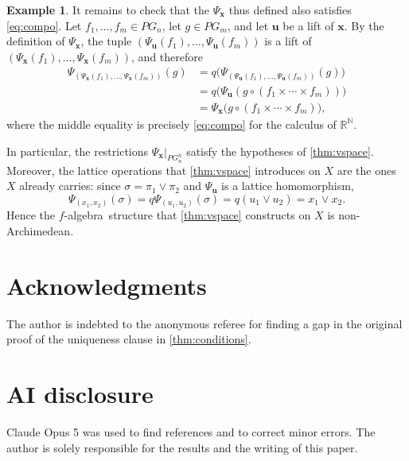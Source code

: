 \documentclass{amsart}
\theoremstyle{plain}
\theoremstyle{definition}
\newtheorem{example}[thm]{Example}
\theoremstyle{remark}
\newcommand\N{\ensuremath{\mathbb{N}}}
\newcommand\R{\ensuremath{\mathbb{R}}}
\newcommand{\falg}{$f\!$-algebra}
\newcommand{\Psx}{\Psi_{\bm x}}
\begin{document}
\begin{example}
    It remains to check that the $\Psx$ thus defined also satisfies \eqref{eq:compo}. Let $f_1,\ldots ,f_m \in
    PG_n$, let $g \in PG_m$, and let $\bm u$ be a lift of $\bm x$. By
    the definition of $\Psx$, the tuple $(\Psi _{\bm u}(f_1),\ldots
    ,\Psi _{\bm u}(f_m))$ is a lift of $(\Psx(f_1),\ldots ,\Psx(f_m))$,
    and therefore
    \begin{align*}
        \Psi _{(\Psx(f_1),\ldots ,\Psx(f_m))}(g)
        &=q\big( \Psi _{(\Psi _{\bm u}(f_1),\ldots ,\Psi _{\bm
        u}(f_m))}(g) \big)\\
        &=q\big( \Psi _{\bm u}(g\circ (f_1\times \cdots \times f_m))
        \big)\\
        &=\Psx\big( g\circ (f_1\times \cdots \times f_m) \big),
    \end{align*}
    where the middle equality is precisely \eqref{eq:compo} for the
    calculus of $\R^{\N}$.

    In particular, the restrictions $\Psx|_{PG_n^{h}}$ satisfy the
    hypotheses of \cref{thm:vspace}. Moreover, the lattice operations
    that \cref{thm:vspace} introduces on $X$ are the ones $X$ already
    carries: since $\sigma =\pi _1\vee \pi _2$ and $\Psi _{\bm u}$ is a
    lattice homomorphism,
    \[
        \Psi _{(x_1,x_2)}(\sigma )=q\Psi _{(u_1,u_2)}(\sigma )=q(u_{1}\vee u_{2})=x_1\vee x_2.
    \]
    Hence the \falg\ structure that \cref{thm:vspace} constructs on
    $X$ is non-Archimedean.
\end{example}

\section*{Acknowledgments}

The author is indebted to the anonymous referee for finding a gap in
the original proof of the uniqueness clause in \cref{thm:conditions}.

\section*{AI disclosure}

Claude Opus 5 was used to find references and to correct minor errors.
The author is solely responsible for the results and the writing of this paper.

\printbibliography
\end{document}
